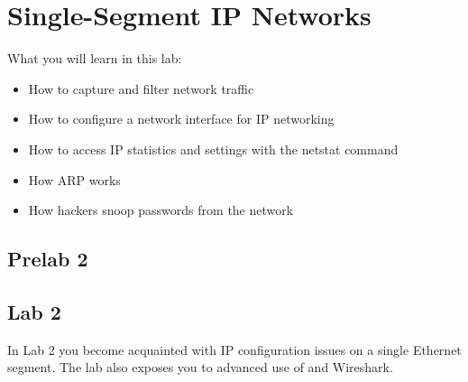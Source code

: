 
\chapter{Single-Segment IP Networks}

What you will learn in this lab:
\begin{itemize}
	\item How to capture and filter network traffic
	\item How to configure a network interface for IP networking
	\item How to access IP statistics and settings with the netstat command
	\item How ARP works
	\item How hackers snoop passwords from the network
\end{itemize}

\newpage
{}
\section{Prelab 2}\label{sec:prelab2}


\newpage
{}
\section{Lab 2}\label{sec:lab2}

In Lab 2 you become acquainted with IP configuration issues on a single Ethernet segment. The lab also exposes you to advanced use of  and Wireshark.

